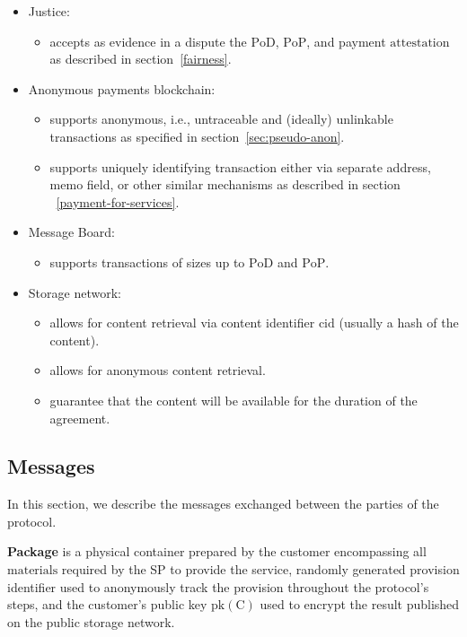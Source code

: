 \documentclass{ieeeaccess}
\begin{document}
\begin{itemize}
\item Justice:
    \begin{itemize}
        \item accepts as evidence in a dispute the $\mathrm{PoD}$, $\mathrm{PoP}$, and payment $\mathrm{attestation}$ as described in section~\ref{fairness}.
    \end{itemize}

\item Anonymous payments blockchain:
    \begin{itemize}
        \item supports anonymous, i.e., untraceable and (ideally) unlinkable transactions as specified in section~\ref{sec:pseudo-anon}.
        \item supports uniquely identifying transaction either via separate address, memo field, or other similar mechanisms as described in section ~\ref{payment-for-services}. 
    \end{itemize}

\item Message Board:
    \begin{itemize}
        \item supports transactions of sizes up to $\mathrm{PoD}$ and $\mathrm{PoP}$.
    \end{itemize}

\item Storage network:
    \begin{itemize}
        \item allows for content retrieval via content identifier $\mathrm{cid}$ (usually a hash of the content).
        \item allows for anonymous content retrieval.
        \item guarantee that the content will be available for the duration of the agreement.
    \end{itemize}
\end{itemize}

\subsection{Messages}\label{messages}
In this section, we describe the messages exchanged between the parties of the protocol.

\vspace{5mm}

\noindent \textbf
{Package}\label{package} is a physical container prepared by the customer encompassing all $\mathrm{materials}$ required by the SP to provide the service, randomly generated provision identifier used to anonymously track the provision throughout the protocol's steps, and the customer's public key $\mathrm{pk(C)}$ used to encrypt the result published on the public storage network.
\end{document}
